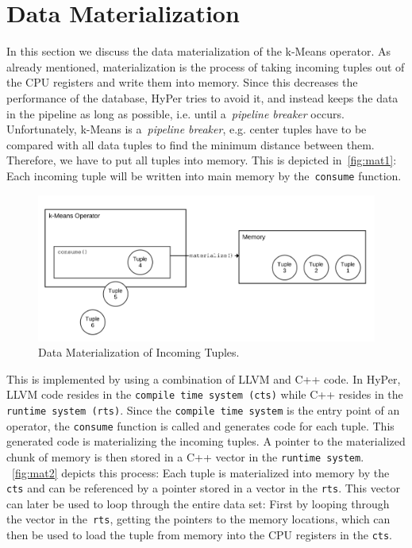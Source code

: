 \section{Data Materialization}

In this section we discuss the data materialization of the k-Means operator. As already mentioned, materialization is the process of taking incoming tuples out of the CPU registers and write them into memory. Since this decreases the performance of the database, HyPer tries to avoid it, and instead keeps the data in the pipeline as long as possible, i.e. until a~\emph{pipeline breaker} occurs. Unfortunately, k-Means is a~\emph{pipeline breaker}, e.g. center tuples have to be compared with all data tuples to find the minimum distance between them. Therefore, we have to put all tuples into memory. This is depicted in~\autoref{fig:mat1}: Each incoming tuple will be written into main memory by the~\texttt{consume} function. 

\begin{figure}[htsb]
  \centerline{
      \includegraphics[scale=0.05]{figures/mat1_font2}
  }
  \caption[Data Materialization of Incoming Tuples]{Data Materialization of Incoming Tuples.}
  \label{fig:mat1}
\end{figure}

This is implemented by using a combination of LLVM and C++ code. In HyPer, LLVM code resides in the \texttt{compile time system (cts)} while C++ resides in the \texttt{runtime system (rts)}. Since the \texttt{compile time system} is the entry point of an operator, the \texttt{consume} function is called and generates code for each tuple. This generated code is materializing the incoming tuples. A pointer to the materialized chunk of memory is then stored in a C++ vector in the \texttt{runtime system}. ~\autoref{fig:mat2} depicts this process: Each tuple is materialized into memory by the \texttt{cts} and can be referenced by a pointer stored in a vector in the \texttt{rts}. This vector can later be used to loop through the entire data set: First by looping through the vector in the~\texttt{rts}, getting the pointers to the memory locations, which can then be used to load the tuple from memory into the CPU registers in the \texttt{cts}. 



